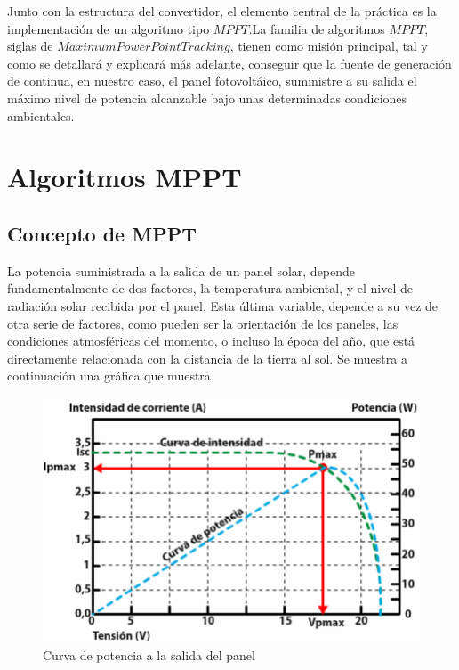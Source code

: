 \documentclass[	DIV=calc,%
							paper=letter,%
							fontsize=12pt%
                            ]{scrartcl}	 					%
\begin{document}
\hfill

Junto con la estructura del convertidor, el elemento central de la práctica es la implementación de un algoritmo tipo $MPPT$.La familia de algoritmos $MPPT$, siglas de $Maximum Power Point Tracking$, tienen como misión principal, tal y como se detallará y explicará más adelante, conseguir que la fuente de generación de continua, en nuestro caso, el panel fotovoltáico, suministre a su salida el máximo nivel de potencia alcanzable bajo unas determinadas condiciones ambientales. 

\newpage

\section{Algoritmos MPPT}

\subsection{Concepto de MPPT}

La potencia suministrada a la salida de un panel solar, depende fundamentalmente de dos factores, la temperatura ambiental, y el nivel de radiación solar recibida por el panel. Esta última variable, depende a su vez de otra serie de factores, como pueden ser la orientación de los paneles, las condiciones atmosféricas del momento, o incluso la época del año, que está directamente relacionada con la distancia de la tierra al sol. Se muestra a continuación una gráfica que muestra 

\hfill

\begin{figure}[h]
\centering
\includegraphics[scale=0.5]{img_mpp}
\caption{Curva de potencia a la salida del panel}
\end{figure}
\end{document}
